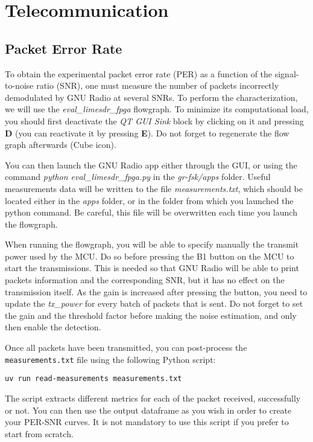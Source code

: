 \section{Telecommunication}
\subsection{Packet Error Rate}
To obtain the experimental packet error rate (PER) as a function of the signal-to-noise ratio (SNR), one must measure the number of packets incorrectly demodulated by GNU Radio at several SNRs. To perform the characterization, we will use the \textit{eval\_limesdr\_fpga} flowgraph. To minimize its computational load, you should first deactivate the \textit{QT GUI Sink} block by clicking on it and pressing \textbf{D} (you can reactivate it by pressing \textbf{E}). Do not forget to regenerate the flow graph afterwards (Cube icon).

You can then launch the GNU Radio app either through the GUI, or using the command \textit{python eval\_limesdr\_fpga.py} in the \textit{gr-fsk/apps} folder. Useful measurements data will be written to the file \textit{measurements.txt}, which should be located either in the \textit{apps} folder, or in the folder from which you launched the python command. Be careful, this file will be overwritten each time you launch the flowgraph.

When running the flowgraph, you will be able to specify manually the transmit power used by the MCU. Do so before pressing the B1 button on the MCU to start the transmissions.  This is needed so that GNU Radio will be able to print packets information and the corresponding SNR, but it has no effect on the transmission itself. As the gain is increased after pressing the button, you need to update the \textit{tx\_power} for every batch of packets that is sent. Do not forget to set the gain and the threshold factor before making the noise estimation, and only then enable the detection.

Once all packets have been transmitted, you can post-process the \texttt{measurements.txt} file using the following Python script:
    \begin{center}
    \texttt{uv run read-measurements measurements.txt}\\
    \end{center}
The script extracts different metrics for each of the packet received, successfully or not. You can then use the output dataframe as you wish in order to create your PER-SNR curves. It is not mandatory to use this script if you prefer to start from scratch.

